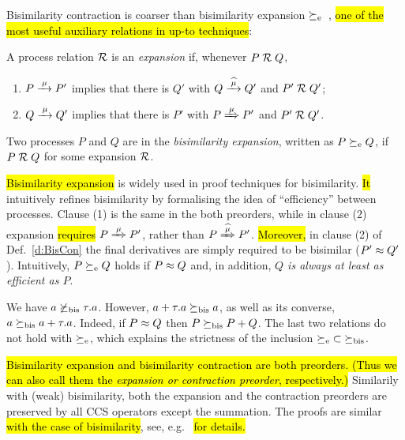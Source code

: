 Bisimilarity contraction is coarser than bisimilarity expansion
$\mathrel{\succeq_{\rm{e}}}$~\cite{arun1992efficiency,sangiorgi2015equations}, \hl{one of the
most useful auxiliary relations in up-to techniques}:
\begin{definition}[expansion]
\label{d:expa}
A process relation ${{\cal R}}$
  is an \emph{expansion} if, whenever $P\mathrel{\cal R} Q$,
 \begin{enumerate}
 \item   $P \arr\mu P'$ implies that there is $Q'$ with $Q \arcap \mu  Q'$
  and $P' \mathrel{\cal R} Q'$;
 \item $Q \arr\mu Q'$ implies that there is $P'$ with $P \Arr \mu P'$ and $P' \mathrel{\cal R} Q'$.
 \end{enumerate}
Two processes $P$ and $Q$ are in the \emph{bisimilarity
  expansion}, written as $P \mathrel{\succeq_{\rm{e}}} Q$, if $P \mathrel{\cal R} Q$ for some expansion ${\cal R}$.
 \end{definition}
\hl{Bisimilarity expansion} is widely used in proof techniques for bisimilarity.
\hl{It} intuitively refines bisimilarity by 
formalising the idea of ``efficiency'' between processes.
Clause (1) is the same in the both preorders, while in clause (2) expansion \hl{requires}
$P \Arr \mu P'$, rather than $P \Arcap \mu P'$.
\hl{Moreover,} in clause (2) of Def.~\ref{d:BisCon} the final derivatives
are simply required to be bisimilar ($P' \approx Q'$).
Intuitively, $P \mathrel{\succeq_{\rm{e}}} Q$ holds if $P\approx Q$ and, in addition, \emph{$Q$
  is always at least as efficient as $P$}.

\begin{example}
\label{exa:contr}
We have %
 $ a \not  \mathrel{\succeq_{\rm{bis}}} \tau. a$. However,
$a+ \tau . a \mathrel{\succeq_{\rm{bis}}} a$, as well as its converse, 
$  a \mathrel{\succeq_{\rm{bis}}} a +
\tau . a $. Indeed, if $P \approx Q$ then 
$  P  \mathrel{\succeq_{\rm{bis}}} P +Q$. The last two relations do not hold with 
$\mathrel{\succeq_{\rm{e}}}$, which explains the strictness of the inclusion
 ${\mathrel{\succeq_{\rm{e}}}} \subset {\mathrel{\succeq_{\rm{bis}}}}$. 
\end{example} 

\hl{Bisimilarity expansion and bisimilarity contraction are both
preorders. (Thus we can also call them the \emph{expansion or contraction
preorder}, respectively.)}
Similarily with (weak) bisimilarity, both the expansion and the
contraction preorders are preserved by all CCS operators except the
summation. The proofs are similar \hl{with the case of bisimilarity},
see, e.g.~\cite{sangiorgi2017equations} \hl{for details.}

